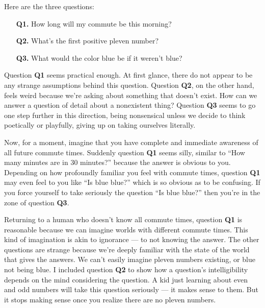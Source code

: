 \documentclass[9pt, twoside]{book}
\theoremstyle{argtstyle}
\begin{document}
Here are the three questions:
\begin{enumerate}
    \item[{\bf Q1.}] How long will my commute be this morning?
    \item[{\bf Q2.}] What's the first positive pleven number?
    \item[{\bf Q3.}] What would the color blue be if it weren't blue?
\end{enumerate}
Question {\bf Q1} seems practical enough. At first glance, there do not appear
to be any strange assumptions behind this question.
Question {\bf Q2}, on the other hand, feels weird because we're asking about
something that doesn't exist. How can we answer a question of detail about a
nonexistent thing? Question {\bf Q3} seems to go one step further in this
direction,
being nonsensical unless we decide to think poetically or
playfully, giving up on taking ourselves literally.

Now, for a moment, imagine that you have complete and immediate awareness of all
future commute times. Suddenly question {\bf Q1} seems silly, similar to
``How many minutes are in 30 minutes?''
because the answer is obvious to you.
Depending on how profoundly
familiar you feel with commute times, question {\bf Q1} may even feel to you
like ``Is blue blue?'' which is so obvious as to be confusing. If you force
yourself to take seriously the question ``Is blue blue?'' then you're in the
zone of question {\bf Q3}.

Returning to a human who doesn't know all commute times,
question {\bf Q1} is
reasonable because we can imagine worlds with different commute
times. This kind of imagination is akin to ignorance --- to not knowing the
answer.
The other questions are strange because we're deeply familiar with the state of
the world that gives the answers. We can't easily imagine pleven numbers
existing, or blue not being blue.
I included question {\bf Q2} to show how a question's intelligibility
depends on the mind
considering the question. A kid just learning about even and odd numbers will
take this question seriously --- it makes sense to them. But it stops making
sense once you realize there are no pleven numbers.
\end{document}
